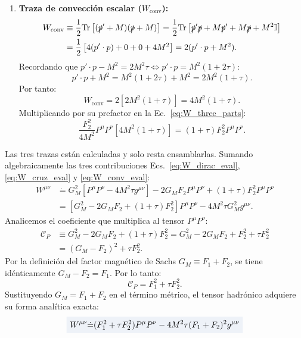 \documentclass[10pt,a4paper]{article}
\newcommand{\dest}[1]{{\setlength{\fboxsep}{4pt}\colorbox{colordest}{$\displaystyle #1$}}}
\begin{document}
\begin{enumerate}
    \item \textbf{Traza de convección escalar ($W_{\text{conv}}$):}
    \begin{align}
    W_{\text{conv}} &\equiv \frac{1}{2} \text{Tr} \left[ (\slashed{p}' + M)(\slashed{p} + M) \right] = \frac{1}{2} \text{Tr} \left[ \slashed{p}' \slashed{p} + M \slashed{p}' + M \slashed{p} + M^2 \mathbb{I} \right] \nonumber \\
    &= \frac{1}{2} \left[ 4 (p' \cdot p) + 0 + 0 + 4 M^2 \right] = 2 (p' \cdot p + M^2).
    \end{align}
    Recordando que $p' \cdot p - M^2 = 2 M^2 \tau \iff p' \cdot p = M^2 (1 + 2\tau)$:
    \begin{equation}
    p' \cdot p + M^2 = M^2 (1 + 2\tau) + M^2 = 2 M^2 (1 + \tau).
    \end{equation}
    Por tanto:
    \begin{equation}
    W_{\text{conv}} = 2 \left[ 2 M^2 (1 + \tau) \right] = 4 M^2 (1 + \tau).
    \end{equation}
    Multiplicando por su prefactor en la Ec.~\eqref{eq:W_three_parts}:
    \begin{equation}
    \frac{F_2^2}{4M^2} P^\mu P^\nu \left[ 4 M^2 (1 + \tau) \right] = (1 + \tau) F_2^2 P^\mu P^\nu.
    \label{eq:W_conv_eval}
    \end{equation}
\end{enumerate}

Las tres trazas están calculadas y solo resta ensamblarlas. Sumando algebraicamente las tres contribuciones Ecs.~\eqref{eq:W_dirac_eval}, \eqref{eq:W_cruz_eval} y \eqref{eq:W_conv_eval}:
\begin{align}
W^{\mu\nu} &\dot{=} G_M^2 \left[ P^\mu P^\nu - 4 M^2 \tau g^{\mu\nu} \right] - 2 G_M F_2 P^\mu P^\nu + (1 + \tau) F_2^2 P^\mu P^\nu \nonumber \\
&= \left[ G_M^2 - 2 G_M F_2 + (1 + \tau) F_2^2 \right] P^\mu P^\nu - 4 M^2 \tau G_M^2 g^{\mu\nu}.
\end{align}
Analicemos el coeficiente que multiplica al tensor $P^\mu P^\nu$:
\begin{align}
\mathcal{C}_P &\equiv G_M^2 - 2 G_M F_2 + (1 + \tau) F_2^2 = G_M^2 - 2 G_M F_2 + F_2^2 + \tau F_2^2 \nonumber \\
&= (G_M - F_2)^2 + \tau F_2^2.
\end{align}
Por la definición del factor magnético de Sachs $G_M \equiv F_1 + F_2$, se tiene idénticamente $G_M - F_2 = F_1$. Por lo tanto:
\begin{equation}
\mathcal{C}_P = F_1^2 + \tau F_2^2.
\end{equation}
Sustituyendo $G_M = F_1 + F_2$ en el término métrico, el tensor hadrónico adquiere su forma analítica exacta:
\begin{equation}
\dest{W^{\mu\nu} \dot{=} (F_1^2 + \tau F_2^2) P^\mu P^\nu - 4 M^2 \tau (F_1 + F_2)^2 g^{\mu\nu}}
\label{eq:W_munu_exact}
\end{equation}
\end{document}
